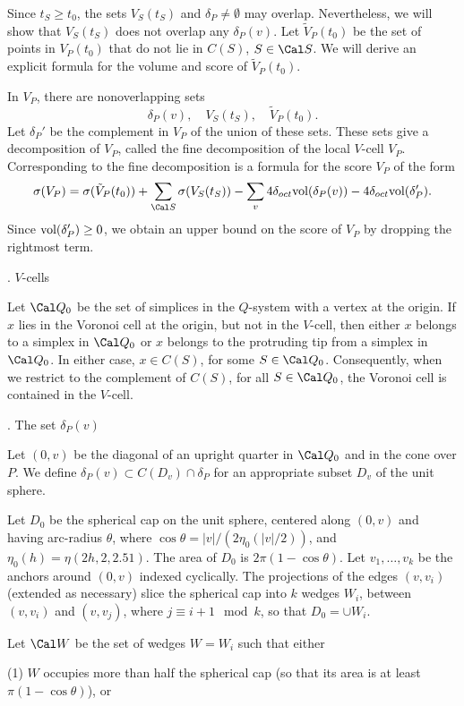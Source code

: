 Since $t_S\ge t_0$, the sets $V_S(t_S)$ and $\delta_P\ne\emptyset$
may overlap.
Nevertheless, we will show that $V_S(t_S)$ does not overlap any
$\delta_P(v)$.  Let $\tilde V_P(t_0)$ be the set of
points in $V_P(t_0)$ that do not lie in $C(S)$,
$S\in\Cal S$.  We will derive an explicit formula for the volume
and score of $\tilde V_P(t_0)$.

In $V_P$, there are nonoverlapping sets
$$\delta_P(v),\quad   V_S(t_S),\quad \tilde V_P(t_0).$$
Let $\delta_P'$ be the complement in $V_P$ of the union of these sets.
These sets give a decomposition of $V_P$,
called the fine decomposition of the local $V$-cell $V_P$.
Corresponding to the fine decomposition is a formula for
the score $V_P$ of the form
$$\sigma(V_P) =
	\sigma(\tilde V_P(t_0))
	+ \sum_{\Cal S}\sigma(V_S(t_S)) 
	-\sum_v 4\doct\Vol(\delta_P(v))-4\doct\Vol(\delta_P').$$
Since $\hbox{vol}(\delta_P')\ge0$, we obtain an upper bound on the score
of $V_P$ by dropping the rightmost term.

\subhead{}. $V$-cells\endsubhead

Let $\Cal Q_0$ be the set of simplices
in the $Q$-system 
with a vertex at the origin.
If $x$ lies in the Voronoi cell at the origin, but not in the $V$-cell,
then either $x$ belongs to a simplex in $\Cal Q_0$ or $x$ belongs
to the protruding tip from a simplex in $\Cal Q_0$.  In either case,
$x\in C(S)$, for some $S\in \Cal Q_0$.  Consequently, when we
restrict to the complement of $C(S)$, for all $S\in \Cal Q_0$,
the Voronoi cell is contained in the $V$-cell.

\subhead{}. The set $\delta_P(v)$\endsubhead

Let $(0,v)$ be the diagonal of an upright quarter in $\Cal Q_0$ and in
	the cone over $P$.
We define $\delta_P(v)\subset C(D_v)\cap \delta_P$ for an appropriate
subset $D_v$ of the unit sphere.

Let $D_0$ be the spherical cap on the unit sphere, centered along
	$(0,v)$ and having arc-radius $\theta$, where
	$\cos\theta = |v|/(2\eta_0(|v|/2))$,
	and $\eta_0(h)=\eta(2h,2,2.51)$.  The area of $D_0$ is
	$2\pi(1-\cos\theta)$.
Let $v_1,\ldots,v_k$ be the anchors around $(0,v)$ indexed cyclically.
	The projections of the edges $(v,v_i)$ (extended as necessary) 
	slice the spherical cap into $k$ wedges $W_i$, between 
	$(v,v_i)$ and $(v,v_j)$, where $j\equiv i+1\mod k$, so that
	$D_0 =\cup W_i$.

Let $\Cal W$ be the set of wedges $W=W_i$  such
that either 

\noindent(1) $W$ occupies more than half the spherical cap (so that
	its area is at least $\pi(1-\cos\theta)$), or

